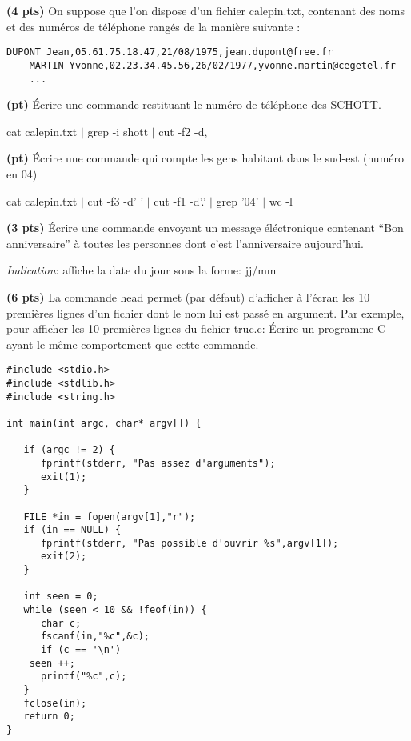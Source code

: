 \documentclass[10pt]{article}
\begin{document}
\begin{Exercice}\textbf{(4 pts)}
  On suppose que l'on dispose d'un fichier calepin.txt, contenant des noms et
  des numéros de téléphone rangés de la manière suivante :
  \begin{Verbatim}[label=calepin.txt,gobble=4]
    DUPONT Jean,05.61.75.18.47,21/08/1975,jean.dupont@free.fr
    MARTIN Yvonne,02.23.34.45.56,26/02/1977,yvonne.martin@cegetel.fr
    ...
  \end{Verbatim}

  \Question \textbf{(\textonehalf pt)} Écrire une commande restituant le numéro
  de téléphone des SCHOTT.
  \begin{Reponse}
cat calepin.txt $|$ grep -i shott $|$ cut -f2 -d,
  \end{Reponse}
  \Question \textbf{(\textonehalf pt)} Écrire une commande qui
  compte les gens habitant dans le sud-est (numéro en 04)
  \begin{Reponse}
     cat calepin.txt $|$ cut -f3 -d' ' $|$ cut -f1 -d'.' $|$ grep '04' $|$ wc -l
  \end{Reponse}

  \Question \textbf{(3 pts)} Écrire une commande envoyant un message
  éléctronique contenant ``Bon anniversaire'' à toutes les personnes dont c'est
  l'anniversaire aujourd'hui.

  \noindent \textit{Indication}:  affiche la date du jour
  sous la forme: jj/mm
\end{Exercice}

\begin{Exercice}\textbf{(6 pts)} 
La commande head permet (par défaut) d'afficher à l'écran les 10 premières
lignes d'un fichier dont le nom lui est passé en argument. Par exemple,
pour afficher les 10 premières lignes du fichier truc.c: 
%
Écrire un programme C ayant le même comportement que cette commande.
 
\begin{Reponse}
  \begin{Verbatim}
#include <stdio.h>
#include <stdlib.h>
#include <string.h>

int main(int argc, char* argv[]) {

   if (argc != 2) {
      fprintf(stderr, "Pas assez d'arguments");
      exit(1);
   }
 
   FILE *in = fopen(argv[1],"r");
   if (in == NULL) {
      fprintf(stderr, "Pas possible d'ouvrir %s",argv[1]);
      exit(2);
   }
      
   int seen = 0;
   while (seen < 10 && !feof(in)) {
      char c;
      fscanf(in,"%c",&c);
      if (c == '\n') 
	seen ++;
      printf("%c",c);
   }
   fclose(in);
   return 0;
}
\end{Verbatim}

\end{Reponse}
\end{Exercice}
\end{document}
